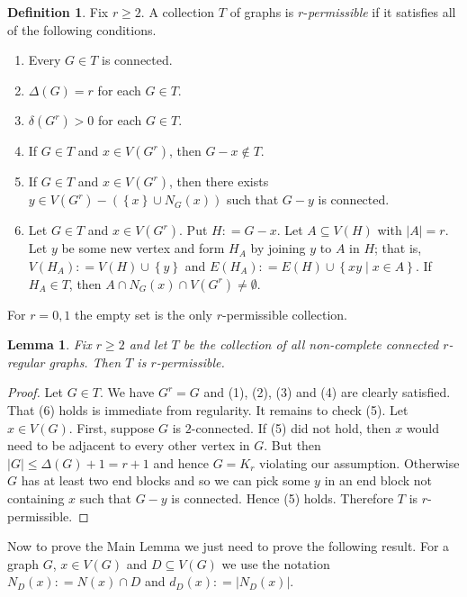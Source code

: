 \documentclass[12pt]{article}
\theoremstyle{plain}
\newtheorem{lem}[thm]{Lemma}
\theoremstyle{definition}
\newtheorem{defn}{Definition}
\theoremstyle{remark}
\newcommand{\set}[1]{\left\{ #1 \right\}}
\newcommand{\setbs}[2]{\left\{ #1 \mid #2 \right\}}
\newcommand{\card}[1]{\left|#1\right|}
\newcommand{\parens}[1]{\left( #1 \right)}
\newcommand{\DefinedAs}{\mathrel{\mathop:}=}
\begin{document}
\begin{defn}
Fix $r \geq 2$.  A collection $T$ of graphs is $r$-\emph{permissible} if it satisfies all of the following conditions.
\begin{enumerate}
\item Every $G \in T$ is connected.
\item $\Delta(G) = r$ for each $G \in T$.
\item $\delta(G^r) > 0$ for each $G \in T$.
\item If $G \in T$ and $x \in V(G^r)$, then $G - x \not \in T$.
\item If $G \in T$ and $x \in V(G^r)$, then there exists $y \in V(G^r) - \parens{\set{x} \cup N_G(x)}$ such that $G - y$ is connected.
\item Let $G \in T$ and $x \in V(G^r)$. Put $H \DefinedAs G - x$.  Let $A \subseteq V(H)$ with $|A| = r$.  Let $y$ be some new vertex and form $H_A$ by joining $y$ to $A$ in $H$; that is, $V(H_A) \DefinedAs V(H) \cup \set{y}$ and $E(H_A) \DefinedAs E(H) \cup \setbs{xy}{x \in A}$.  If $H_A \in T$, then $A \cap N_G(x) \cap V(G^r) \neq \emptyset$.
\end{enumerate}

\noindent For $r = 0, 1$ the empty set is the only $r$-permissible collection.
\end{defn}

\begin{lem}
Fix $r \geq 2$ and let $T$ be the collection of all non-complete connected $r$-regular graphs.  Then $T$ is $r$-permissible.
\end{lem}
\begin{proof}
Let $G \in T$. We have $G^r = G$ and (1), (2), (3) and (4) are clearly satisfied.  That (6) holds is immediate from regularity.  It remains to check (5).  Let $x \in V(G)$.  First, suppose $G$ is $2$-connected.  If (5) did not hold, then $x$ would need to be adjacent to every other vertex in $G$.  But then $\card{G} \leq \Delta(G) + 1 = r+1$ and hence $G = K_r$ violating our assumption.  Otherwise $G$ has at least two end blocks and so we can pick some $y$ in an end block not containing $x$ such that $G-y$ is connected.  Hence (5) holds.  Therefore $T$ is $r$-permissible.
\end{proof}

Now to prove the Main Lemma we just need to prove the following result. For a graph $G$, $x \in V(G)$ and $D \subseteq V(G)$ we use the notation $N_D(x) \DefinedAs N(x) \cap D$ and $d_D(x) \DefinedAs \card{N_D(x)}$.
\end{document}
